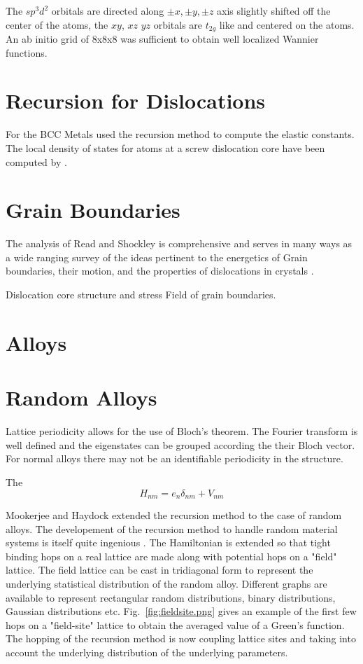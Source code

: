The $sp^{3}d^{2}$ orbitals are directed along $\pm x, \pm y, \pm z$ axis 
slightly shifted off the center of the atoms, the $xy$, $xz$ $yz$ orbitals are
$t_{2g}$ like and centered on the atoms. An ab initio grid of 8x8x8 was sufficient
to obtain well localized Wannier functions.

\section{Recursion for Dislocations}
For the BCC Metals \cite{terakura84} used the recursion method to compute the elastic constants.
The local density of states for atoms at a screw dislocation core have been computed by \cite{paidar81}. 

\section{Grain Boundaries}
The analysis of Read and Shockley is comprehensive and serves in many ways as a wide
ranging survey of the ideas pertinent to the energetics of Grain boundaries, their motion, 
and the properties of dislocations in crystals \cite{read50}.

Dislocation core structure and stress Field of grain boundaries.

\section{Alloys}
\section{Random Alloys}
Lattice periodicity allows for the use of Bloch's theorem. The Fourier transform
is well defined and the eigenstates can be grouped according the their Bloch vector.
For normal alloys there may not be an identifiable periodicity in the structure.

The 
%
\begin{equation}
H_{nm} = e_{n}\delta_{nm} + V_{nm}
\end{equation}
%

Mookerjee and Haydock extended the recursion method to the case of random alloys.
The developement of the recursion method to handle random material systems is 
itself quite ingenious \cite{mookerjee, haydock74}. The Hamiltonian is extended
so that tight binding hops on a real lattice are made along with potential hops
on a "field" lattice. The field lattice can be cast in tridiagonal form to represent
the underlying statistical distribution of the random alloy. Different graphs are available
to represent rectangular random distributions, binary distributions, Gaussian distributions
etc. Fig.~\ref{fig:fieldsite.png} gives an example of the first few hops on a "field-site" 
lattice to obtain the averaged value of a Green's function. The hopping of the recursion method
is now coupling lattice sites and taking into account the underlying distribution of 
the underlying parameters.

